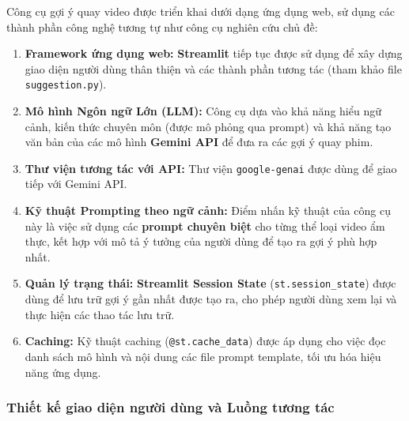 \noindent
Công cụ gợi ý quay video được triển khai dưới dạng ứng dụng web, sử dụng các thành phần công nghệ tương tự như công cụ nghiên cứu chủ đề:
\begin{enumerate}
    \item \textbf{Framework ứng dụng web:} \textbf{Streamlit} tiếp tục được sử dụng để xây dựng giao diện người dùng thân thiện và các thành phần tương tác (tham khảo file \texttt{suggestion.py}).

    \item \textbf{Mô hình Ngôn ngữ Lớn (LLM):} Công cụ dựa vào khả năng hiểu ngữ cảnh, kiến thức chuyên môn (được mô phỏng qua prompt) và khả năng tạo văn bản của các mô hình \textbf{Gemini API} để đưa ra các gợi ý quay phim.
    
    \item \textbf{Thư viện tương tác với API:} Thư viện \texttt{google-genai} được dùng để giao tiếp với Gemini API.
    
    \item \textbf{Kỹ thuật Prompting theo ngữ cảnh:} Điểm nhấn kỹ thuật của công cụ này là việc sử dụng các \textbf{prompt chuyên biệt} cho từng thể loại video ẩm thực, kết hợp với mô tả ý tưởng của người dùng để tạo ra gợi ý phù hợp nhất.
    
    \item \textbf{Quản lý trạng thái:} \textbf{Streamlit Session State} (\texttt{st.session\_state}) được dùng để lưu trữ gợi ý gần nhất được tạo ra, cho phép người dùng xem lại và thực hiện các thao tác lưu trữ.
    
    \item \textbf{Caching:} Kỹ thuật caching (\texttt{@st.cache\_data}) được áp dụng cho việc đọc danh sách mô hình và nội dung các file prompt template, tối ưu hóa hiệu năng ứng dụng.
\end{enumerate}

\subsubsection{Thiết kế giao diện người dùng và Luồng tương tác}

